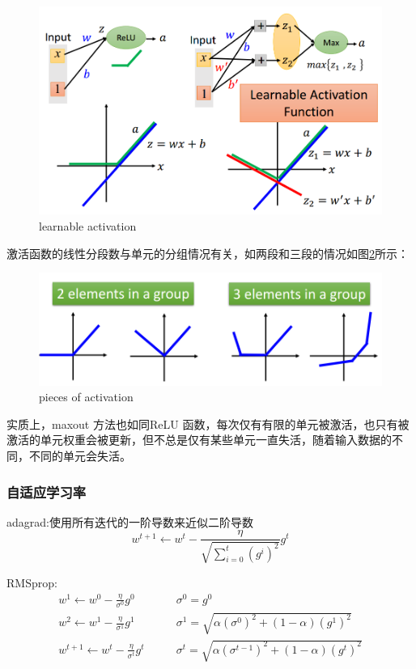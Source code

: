 \begin{figure}[htb]
	\centering
	\includegraphics[scale=0.4]{pic/learnable_activation}
	\caption{learnable activation}
	\label{fig:learnable_activation}
\end{figure}

激活函数的线性分段数与单元的分组情况有关，如两段和三段的情况如图\ref{fig:pieces_of_activation}所示：
\begin{figure}[htb]
	\centering
	\includegraphics[scale=0.4]{pic/pieces_of_activation}
	\caption{pieces of activation}
	\label{fig:pieces_of_activation}
\end{figure}

实质上，maxout 方法也如同ReLU 函数，每次仅有有限的单元被激活，也只有被激活的单元权重会被更新，但不总是仅有某些单元一直失活，随着输入数据的不同，不同的单元会失活。

\subsubsection{自适应学习率}
adagrad:使用所有迭代的一阶导数来近似二阶导数
\[
w ^ { t + 1 } \leftarrow w ^ { t } - \frac { \eta } { \sqrt { \sum _ { i = 0 } ^ { t } \left( g ^ { i } \right) ^ { 2 } } } g ^ { t }
\]

RMSprop:
\begin{align}
w ^ { 1 } \leftarrow w ^ { 0 } - \frac { \eta } { \sigma ^ { 0 } } g ^ { 0 } \qquad & \sigma ^ { 0 } = g ^ { 0 }\\
w ^ { 2 } \leftarrow w ^ { 1 } - \frac { \eta } { \sigma ^ { 1 } } g ^ { 1 } \qquad & \sigma ^ { 1 } = \sqrt { \alpha \left( \sigma ^ { 0 } \right) ^ { 2 } + ( 1 - \alpha ) \left( g ^ { 1 } \right) ^ { 2 } }\\
w ^ { t + 1 } \leftarrow w ^ { t } - \frac { \eta } { \sigma ^ { t } } g ^ { t } \qquad & \sigma ^ { t } = \sqrt { \alpha \left( \sigma ^ { t - 1 } \right) ^ { 2 } + ( 1 - \alpha ) \left( g ^ { t } \right) ^ { 2 } }
\end{align}


